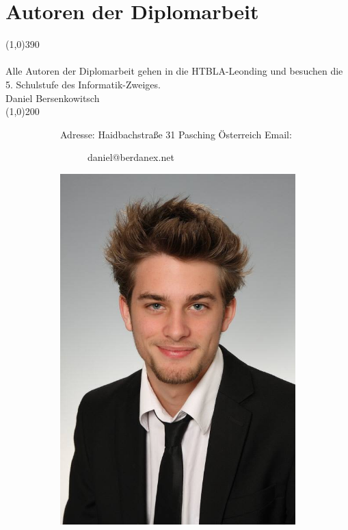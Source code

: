 \documentclass[FIPLY_base.tex]{subfiles}
\begin{document}
	\section{Autoren der Diplomarbeit}
	\line(1,0){390}
	\ \\
	\ \\
	Alle Autoren der Diplomarbeit gehen in die HTBLA-Leonding und besuchen die 5. Schulstufe des Informatik-Zweiges.
	\ \\
	\newline\newline
	{\Large Daniel Bersenkowitsch}
	\ \\
	\line(1,0){200}
	\begin{figure}[H]
		\begin{subfigure}[b]{0.3\textwidth}
			Adresse: \newline
			Haidbachstraße 31  Pasching \newline
			Österreich \newline
			\newline
			Email:
			\begin{subfigure}[b]{0.2\textwidth}
				daniel@berdanex.net
			\end{subfigure}
		\end{subfigure}
		\hfil
		\begin{subfigure}[b]{0.2\textwidth}
			\includegraphics[scale=0.1]{img/dani}
		\end{subfigure}
	\end{figure}
	
\end{document}
